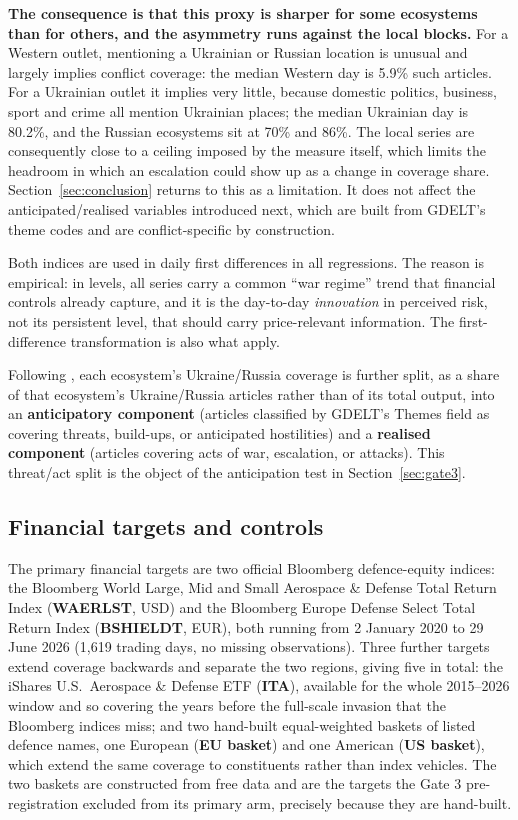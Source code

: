 \documentclass[12pt,a4paper]{article}
\begin{document}
\textbf{The consequence is that this proxy is sharper for some ecosystems than for others, and the asymmetry runs against the local blocks.} For a Western outlet, mentioning a Ukrainian or Russian location is unusual and largely implies conflict coverage: the median Western day is 5.9\% such articles. For a Ukrainian outlet it implies very little, because domestic politics, business, sport and crime all mention Ukrainian places; the median Ukrainian day is 80.2\%, and the Russian ecosystems sit at 70\% and 86\%. The local series are consequently close to a ceiling imposed by the measure itself, which limits the headroom in which an escalation could show up as a change in coverage share. Section~\ref{sec:conclusion} returns to this as a limitation. It does not affect the anticipated/realised variables introduced next, which are built from GDELT's theme codes and are conflict-specific by construction.

Both indices are used in daily first differences in all regressions. The reason is empirical: in levels, all series carry a common ``war regime'' trend that financial controls already capture, and it is the day-to-day \textit{innovation} in perceived risk, not its persistent level, that should carry price-relevant information. The first-difference transformation is also what \citet{bondarenko2024} apply.

Following \citet{caldara2022}, each ecosystem's Ukraine/Russia coverage is further split, as a share of that ecosystem's Ukraine/Russia articles rather than of its total output, into an \textbf{anticipatory component} (articles classified by GDELT's Themes field as covering threats, build-ups, or anticipated hostilities) and a \textbf{realised component} (articles covering acts of war, escalation, or attacks). This threat/act split is the object of the anticipation test in Section~\ref{sec:gate3}.

\subsection{Financial targets and controls}

The primary financial targets are two official Bloomberg defence-equity indices: the Bloomberg World Large, Mid and Small Aerospace \& Defense Total Return Index (\textbf{WAERLST}, USD) and the Bloomberg Europe Defense Select Total Return Index (\textbf{BSHIELDT}, EUR), both running from 2 January 2020 to 29 June 2026 (1,619 trading days, no missing observations). Three further targets extend coverage backwards and separate the two regions, giving five in total: the iShares U.S.\ Aerospace \& Defense ETF (\textbf{ITA}), available for the whole 2015--2026 window and so covering the years before the full-scale invasion that the Bloomberg indices miss; and two hand-built equal-weighted baskets of listed defence names, one European (\textbf{EU basket}) and one American (\textbf{US basket}), which extend the same coverage to constituents rather than index vehicles. The two baskets are constructed from free data and are the targets the Gate 3 pre-registration excluded from its primary arm, precisely because they are hand-built.
\end{document}

